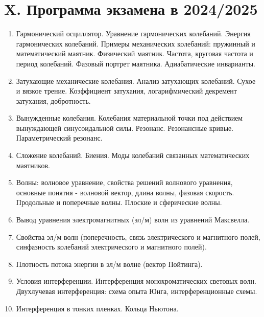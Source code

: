 \documentclass[12pt]{article}
\begin{document}

\clearpage

\section{X. Программа экзамена в 2024/2025}

\begin{enumerate}

    \item Гармонический осциллятор. Уравнение гармонических колебаний. Энергия гармонических колебаний. Примеры механических колебаний: пружинный и математический маятник. Физический маятник. Частота, круговая частота и период колебаний. Фазовый портрет маятника. Адиабатические инварианты.

    \item Затухающие механические колебания. Анализ затухающих колебаний. Сухое и вязкое трение. Коэффициент затухания, логарифмический декремент затухания, добротность.

    \item Вынужденные колебания. Колебания материальной точки под действием вынуждающей синусоидальной силы. Резонанс. Резонансные кривые. Параметрический резонанс.

    \item Сложение колебаний. Биения. Моды колебаний связанных математических маятников.

    \item Волны: волновое уравнение, свойства решений волнового уравнения, основные понятия - волновой вектор, длина волны, фазовая скорость. Продольные и поперечные волны. Плоские и сферические волны.

    \item Вывод уравнения электромагнитных (эл/м) волн из уравнений Максвелла.

    \item Свойства эл/м волн (поперечность, связь электрического и магнитного полей, синфазность колебаний электрического и магнитного полей).

    \item Плотность потока энергии в эл/м волне (вектор Пойтинга).

    \item Условия интерференции. Интерференция монохроматических световых волн. Двухлучевая интерференция: схема опыта Юнга, интерференционные схемы.

    \item Интерференция в тонких пленках. Кольца Ньютона.


\end{enumerate}
\end{document}
